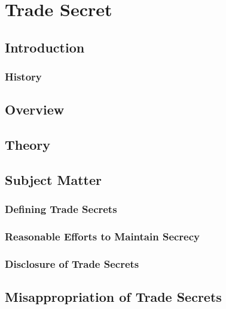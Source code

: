 \section{Trade Secret}

\subsection{Introduction}

\subsubsection{History}


\subsection{Overview}


\subsection{Theory}


\subsection{Subject Matter}

\subsubsection{Defining Trade Secrets}


\subsubsection{Reasonable Efforts to Maintain Secrecy}


\subsubsection{Disclosure of Trade Secrets}


\subsection{Misappropriation of Trade Secrets}

